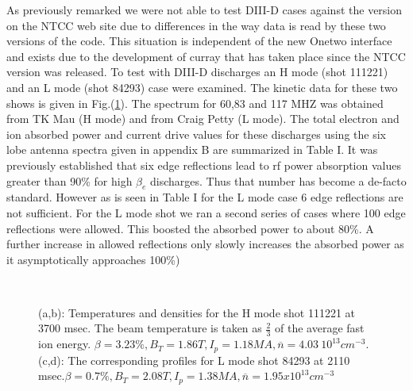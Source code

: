   As previously remarked we were not able to test DIII-D cases against
  the \ct version on the NTCC web site due to differences in the
 way \ot data is read by these two  versions of the code.
 This situation is independent of the new Onetwo interface and exists
 due to the development of curray that has taken place  since
 the NTCC version was released. To test \ct  with  DIII-D discharges an H mode
(shot 111221) and an L mode (shot 84293) case were examined. The
kinetic data for these two shows is given in Fig.(\ref{f1}). The 
spectrum for 60,83 and 117 MHZ was obtained from TK Mau (H mode)  and from
Craig Petty (L mode). The total electron and ion absorbed power and
current drive values for these discharges using the six lobe antenna
spectra given in appendix B are summarized in Table I. It was
previously established \cite{b3} that six edge reflections lead to
rf power absorption values greater than 90\% for high $\beta_e$
discharges. Thus that number has become a de-facto standard. However as
is seen in Table I for the L mode case 6 edge reflections are not
sufficient. For the L mode shot we ran a second series of cases where
 100 edge reflections were allowed. This boosted the absorbed power to
 about 80\%. A further increase in allowed reflections only slowly
increases the absorbed power as it asymptotically approaches 100\%) 

 \begin{figure}[hbt] %
 \centering 
\begin{narrow}{-.50in}{0in}   
 \mbox{}
\\[20pt]
 \mbox{}
\end{narrow}
 \caption{(a,b): Temperatures and densities for the H mode shot 111221
   at 3700 msec. The beam temperature is taken as $\frac{2}{3} $ of the
   average fast ion energy. $\beta = 3.23\%, B_T = 1.86 T, I_p = 1.18 MA
   ,
\overline{ n} = 4.03\ 10^{13} cm^{-3}$.
    (c,d): The corresponding profiles for L mode shot 84293 at 2110
    msec.$\beta = 0.7\%, B_T = 2.08 T, I_p = 1.38 MA , \overline{ n} = 1.95 x 10^{13} cm^{-3}$}
  \label{f1}
 \end{figure}

